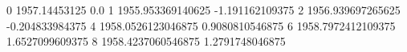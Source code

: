 0 1957.14453125 0.0
1 1955.953369140625 -1.191162109375
2 1956.939697265625 -0.204833984375
4 1958.0526123046875 0.9080810546875
6 1958.7972412109375 1.6527099609375
8 1958.4237060546875 1.2791748046875
